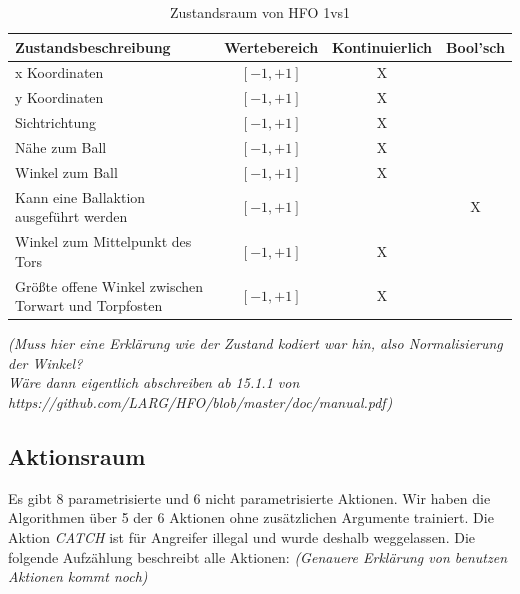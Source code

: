             \begin{table}[H]
                \begin{center}
                \hspace*{-1.5cm}
                \begin{tabular}{ |l|c|c|c| } 
                    \hline
                    \hfill Zustandsbeschreibung & Wertebereich & Kontinuierlich & Bool'sch \\ \hline
                    x Koordinaten & $[ -1, +1 ]$ & X & \hfill \\ \hline
                    y Koordinaten & $[ -1, +1 ]$ & X & \hfill \\ \hline
                    Sichtrichtung & $[ -1, +1]$ & X & \hfill \\ \hline
                    Nähe zum Ball & $[ -1, +1 ]$ & X & \hfill \\ \hline
                    Winkel zum Ball & $[ -1, +1 ]$ & X & \hfill \\ \hline
                    Kann eine Ballaktion ausgeführt werden & $[ -1, +1 ]$ & \hfill & X \\ \hline
                    Winkel zum Mittelpunkt des Tors & $[ -1, +1 ]$ & X & \hfill \\ \hline
                    Größte offene Winkel zwischen Torwart und Torpfosten & $[ -1, +1 ]$ & X & \hfill \\ \hline
                \end{tabular}
                \end{center}
                \caption{Zustandsraum von HFO 1vs1 \label{fig:somelabel}}
            \end{table}

            \hspace*{-1.5cm}
            \textit{(Muss hier eine Erklärung wie der Zustand kodiert war hin, also Normalisierung der Winkel?\\
            \hspace*{-1.5cm} Wäre dann eigentlich abschreiben ab 15.1.1 von https://github.com/LARG/HFO/blob/master/doc/manual.pdf)}
        \subsection{Aktionsraum}
            Es gibt 8 parametrisierte und 6 nicht parametrisierte Aktionen. Wir haben die Algorithmen über 5 der 6 Aktionen ohne zusätzlichen Argumente trainiert. Die Aktion \textit{CATCH} ist für Angreifer illegal und wurde deshalb weggelassen. Die folgende Aufzählung beschreibt alle Aktionen:
            \textit{(Genauere Erklärung von benutzen Aktionen kommt noch)}


